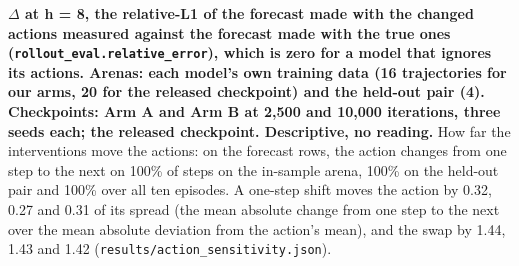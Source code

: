 \documentclass[10pt]{article}
\begin{document}
\begin{center}\small{}\end{center}

\textbf{$\Delta$ at h = 8, the relative-L1 of the forecast made with the changed actions measured against the forecast made with the true ones (\texttt{rollout\_eval.relative\_error}), which is zero for a model that ignores its actions. Arenas: each model's own training data (16 trajectories for our arms, 20 for the released checkpoint) and the held-out pair (4). Checkpoints: Arm A and Arm B at 2,500 and 10,000 iterations, three seeds each; the released checkpoint. Descriptive, no reading.} How far the interventions move the actions: on the forecast rows, the action changes from one step to the next on 100\% of steps on the in-sample arena, 100\% on the held-out pair and 100\% over all ten episodes. A one-step shift moves the action by 0.32, 0.27 and 0.31 of its spread (the mean absolute change from one step to the next over the mean absolute deviation from the action's mean), and the swap by 1.44, 1.43 and 1.42 (\texttt{results/\allowbreak{}action\_\allowbreak{}sensitivity\allowbreak{}.json}).
\end{document}
